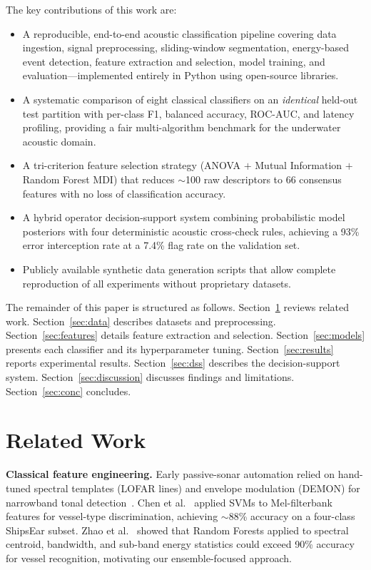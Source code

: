 \documentclass[conference]{IEEEtran}
\begin{document}
The key contributions of this work are:
\begin{itemize}
  \item A reproducible, end-to-end acoustic classification pipeline covering data ingestion, signal preprocessing, sliding-window segmentation, energy-based event detection, feature extraction and selection, model training, and evaluation---implemented entirely in Python using open-source libraries.
  \item A systematic comparison of eight classical classifiers on an \textit{identical} held-out test partition with per-class F1, balanced accuracy, ROC-AUC, and latency profiling, providing a fair multi-algorithm benchmark for the underwater acoustic domain.
  \item A tri-criterion feature selection strategy (ANOVA $+$ Mutual Information $+$ Random Forest MDI) that reduces $\sim$100 raw descriptors to 66 consensus features with no loss of classification accuracy.
  \item A hybrid operator decision-support system combining probabilistic model posteriors with four deterministic acoustic cross-check rules, achieving a 93\% error interception rate at a 7.4\% flag rate on the validation set.
  \item Publicly available synthetic data generation scripts that allow complete reproduction of all experiments without proprietary datasets.
\end{itemize}

The remainder of this paper is structured as follows. Section~\ref{sec:related} reviews related work. Section~\ref{sec:data} describes datasets and preprocessing. Section~\ref{sec:features} details feature extraction and selection. Section~\ref{sec:models} presents each classifier and its hyperparameter tuning. Section~\ref{sec:results} reports experimental results. Section~\ref{sec:dss} describes the decision-support system. Section~\ref{sec:discussion} discusses findings and limitations. Section~\ref{sec:conc} concludes.

\section{Related Work}
\label{sec:related}

\textbf{Classical feature engineering.} Early passive-sonar automation relied on hand-tuned spectral templates (LOFAR lines) and envelope modulation (DEMON) for narrowband tonal detection~\cite{lofar_demon}. Chen et al.~\cite{svm_vessel} applied SVMs to Mel-filterbank features for vessel-type discrimination, achieving $\sim$88\% accuracy on a four-class ShipsEar subset. Zhao et al.~\cite{zhao2017} showed that Random Forests applied to spectral centroid, bandwidth, and sub-band energy statistics could exceed 90\% accuracy for vessel recognition, motivating our ensemble-focused approach.
\end{document}
